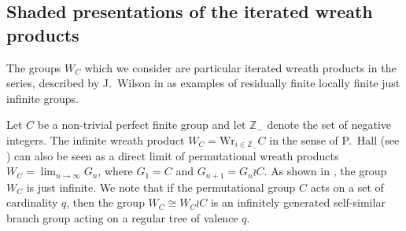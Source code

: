 \documentclass[12pt,a4paper]{amsart}
\begin{document}
\subsection{Shaded presentations of the iterated wreath products}
The groups $W_C$ which we consider are particular iterated wreath products in the series, described by J.~Wilson in \cite{Wilson1971} as examples of residually finite locally finite just infinite groups. 

\smallskip

Let $C$ be a non-trivial perfect finite group and let $\mathbb Z_-$ denote the set of negative integers. The infinite wreath product $W_C=\text{Wr}_{i\in \mathbb Z_-}C$ in the sense of P.~Hall (see \cite{Hall1962}) can also be seen as a direct limit of permutational wreath products $W_C=\lim_{n\to \infty} G_n$, where $G_1=C$ and $G_{n+1}=G_n \wr C$. As shown in \cite[Construction 2]{Wilson1971}, the group $W_C$ is just infinite. We note that if the permutational group $C$ acts on a set of cardinality $q$, then the group $W_C \cong W_C \wr C$ is an infinitely generated self-similar branch group acting on a regular tree of valence $q$.
\end{document}
